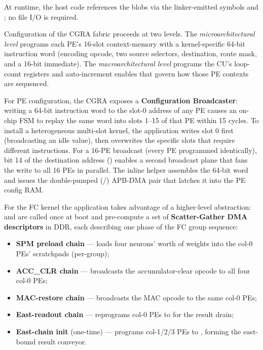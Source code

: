 At runtime, the host code references the blobs via the linker-emitted
symbols  and ; no file I/O
is required.

Configuration of the CGRA fabric proceeds at two levels. The
\emph{microarchitectural level} programs each PE's 16-slot context-memory
with a kernel-specific 64-bit instruction word (encoding opcode, two
source selectors, destination, route mask, and a 16-bit immediate).
The \emph{macroarchitectural level} programs the CU's loop-count
registers and auto-increment enables that govern how those PE contexts
are sequenced.

For PE configuration, the CGRA exposes a \textbf{Configuration Broadcaster}:
writing a 64-bit instruction word to the slot-0 address of any PE causes
an on-chip FSM to replay the same word into slots 1--15 of that PE within
15 cycles. To install a heterogeneous multi-slot kernel, the application
writes slot 0 first (broadcasting an idle value), then overwrites the
specific slots that require different instructions. For a 16-PE broadcast
(every PE programmed identically), bit 14 of the destination address
() enables a second broadcast plane that
fans the write to all 16 PEs in parallel. The inline helper
 assembles the 64-bit word and issues the
double-pumped (/) APB-DMA pair that latches it into
the PE config RAM.

For the FC kernel the application takes advantage of a higher-level
abstraction:  and
 are called once at boot and pre-compute
a set of \textbf{Scatter-Gather DMA descriptors} in DDR, each describing
one phase of the FC group sequence:

\begin{itemize}[leftmargin=1.3cm,itemsep=2pt,topsep=2pt]
\item \textbf{SPM preload chain} --- loads four neurons' worth of weights
      into the col-0 PEs' scratchpads (per-group);
\item \textbf{ACC\_CLR chain} --- broadcasts the accumulator-clear opcode
      to all four col-0 PEs;
\item \textbf{MAC-restore chain} --- broadcasts the MAC opcode to the
      same col-0 PEs;
\item \textbf{East-readout chain} --- reprograms col-0 PEs to
       for the result drain;
\item \textbf{East-chain init} (one-time) --- programs col-1/2/3 PEs to
      , forming the east-bound result
      conveyor.
\end{itemize}

